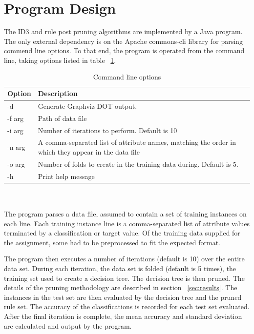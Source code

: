 \documentclass[10pt]{report}
\begin{document}
\section{Program Design}
The ID3 and rule post pruning algorithms are implemented by a Java
program. The only external dependency is on the Apache commons-cli
library for parsing commend line options. To that end, the program is
operated from the command line, taking options listed in table
~\ref{tab:commandline}.  
\\
\begin{table}[h]
  \centering
  \begin{tabular}{ |l|p{10cm}|} 
    \hline
    Option & Description \\ \hline
    -d          &  Generate Graphviz DOT output. \\ \hline
    -f \<arg\>  &  Path of data file \\ \hline
    -i \<arg\>  &  Number of iterations to perform. Default is 10 \\ \hline
    -n \<arg\>  &  A comma-separated list of attribute names, matching
    the order in which they appear in the data file \\ \hline
    -o \<arg\>  &  Number of folds to create in the training data during. Default is 5. \\ \hline
    -h          &  Print help message \\ \hline
  \end{tabular}
  \caption{Command line options}
  \label{tab:commandline}
\end{table}
\\\\
The program parses a data file, assumed to contain a set of training
instances on each line. Each training instance line is a
comma-separated list of attribute values terminated by a
classification or target value. Of the training data supplied for the
assignment, some had to be preprocessed to fit the expected format.

The program then executes a number of iterations (default is 10) over
the entire data set. During each iteration, the data set is folded
(default is 5 times), the training set used to create a decision
tree. The decision tree is then pruned. The details of the pruning
methodology are described in section ~\ref{sec:results}. The instances
in the test set are then evaluated by the decision tree and the pruned
rule set. The accuracy of the classifications is recorded for each
test set evaluated. After the final iteration is complete, the mean
accuracy and standard deviation are calculated and output by the
program.
\end{document}
